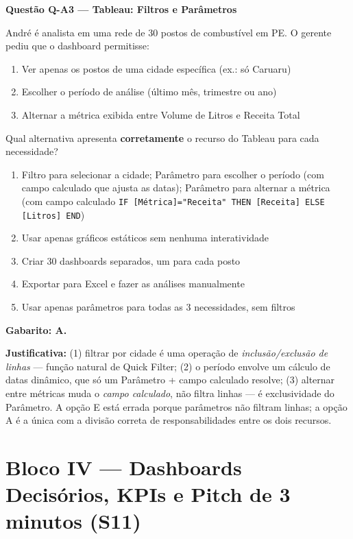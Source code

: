 \begin{SolvedBox}
\textbf{Questão Q-A3 — Tableau: Filtros e Parâmetros}

André é analista em uma rede de 30 postos de combustível em PE. O gerente pediu que o
dashboard permitisse:
\begin{enumerate}
  \item Ver apenas os postos de uma cidade específica (ex.: só Caruaru)
  \item Escolher o período de análise (último mês, trimestre ou ano)
  \item Alternar a métrica exibida entre Volume de Litros e Receita Total
\end{enumerate}

Qual alternativa apresenta \textbf{corretamente} o recurso do Tableau para cada necessidade?

\begin{enumerate}[label=\Alph*)]
  \item Filtro para selecionar a cidade; Parâmetro para escolher o período
  (com campo calculado que ajusta as datas); Parâmetro para alternar a métrica
  (com campo calculado \texttt{IF [Métrica]="Receita" THEN [Receita] ELSE [Litros] END})
  \item Usar apenas gráficos estáticos sem nenhuma interatividade
  \item Criar 30 dashboards separados, um para cada posto
  \item Exportar para Excel e fazer as análises manualmente
  \item Usar apenas parâmetros para todas as 3 necessidades, sem filtros
\end{enumerate}

\textbf{Gabarito: A.}

\textbf{Justificativa:} (1) filtrar por cidade é uma operação de \emph{inclusão/exclusão
de linhas} — função natural de Quick Filter; (2) o período envolve um cálculo de datas
dinâmico, que só um Parâmetro + campo calculado resolve; (3) alternar entre métricas
muda o \emph{campo calculado}, não filtra linhas — é exclusividade do Parâmetro.
A opção E está errada porque parâmetros não filtram linhas; a opção A é a única com a
divisão correta de responsabilidades entre os dois recursos.
\end{SolvedBox}

\section{Bloco IV — Dashboards Decisórios, KPIs e Pitch de 3 minutos (S11)}

